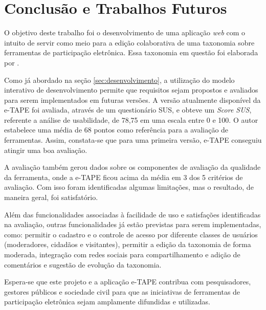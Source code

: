 \chapter[Conclusão e Trabalhos Futuros]{Conclusão e Trabalhos Futuros}
\label{cap:cap5}

O objetivo deste trabalho foi o desenvolvimento de uma aplicação \textit{web} com o intuito de servir como meio para a edição colaborativa de uma taxonomia
sobre ferramentas de participação eletrônica. Essa taxonomia em questão foi elaborada por .

\par
Como já abordado na seção \ref{sec:desenvolvimento}, a utilização do modelo interativo de desenvolvimento permite que requisitos sejam propostos e avaliados para serem
implementados em futuras versões. A versão atualmente disponível da e-TAPE foi avaliada, através de um questionário SUS, e obteve um \textit{Score SUS}, referente a análise de usabilidade,
de 78,75 em uma escala entre 0 e 100. O autor  estabelece uma média de 68 pontos como referência para a avaliação de ferramentas. 
Assim, constata-se que para uma primeira versão, e-TAPE conseguiu atingir uma boa avaliação. 

\par
A avaliação também gerou dados sobre os componentes de avaliação da qualidade da ferramenta, onde a e-TAPE ficou acima da média em 3 dos 5 critérios de avaliação. Com isso foram
identificadas algumas limitações, mas o resultado, de maneira geral, foi satisfatório. 

\par
Além das funcionalidades associadas à facilidade de uso e satisfações identificadas na avaliação, outras funcionalidades já estão previstas para serem implementadas, como: permitir o cadastro e o controle de acesso por diferente classes de usuários (moderadores, cidadãos e visitantes), permitir a edição da taxonomia de forma moderada, integração com redes sociais para compartilhamento e adição de comentários e sugestão de evolução da taxonomia. 

\par
Espera-se que este projeto e a aplicação e-TAPE contribua com pesquisadores, gestores públicos e sociedade civil para que as iniciativas de ferramentas de participação eletrônica
sejam amplamente difundidas e utilizadas. 

